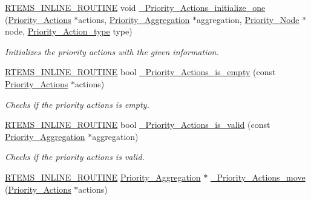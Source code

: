 \begin{DoxyCompactItemize}
\mbox{\hyperlink{group__RTEMSScoreBaseDefs_gac216239df231d5dbd15e3520b0b9313f}{R\+T\+E\+M\+S\+\_\+\+I\+N\+L\+I\+N\+E\+\_\+\+R\+O\+U\+T\+I\+NE}} void \mbox{\hyperlink{group__RTEMSScorePriority_gad2be4119adbe29c7da28463477622c8c}{\+\_\+\+Priority\+\_\+\+Actions\+\_\+initialize\+\_\+one}} (\mbox{\hyperlink{structPriority__Actions}{Priority\+\_\+\+Actions}} $\ast$actions, \mbox{\hyperlink{structPriority__Aggregation}{Priority\+\_\+\+Aggregation}} $\ast$aggregation, \mbox{\hyperlink{structPriority__Node}{Priority\+\_\+\+Node}} $\ast$node, \mbox{\hyperlink{group__RTEMSScorePriority_gae6fceeae8a1c66316277dc3b52e3ba27}{Priority\+\_\+\+Action\+\_\+type}} type)
\begin{DoxyCompactList}\small\item\em Initializes the priority actions with the given information. \end{DoxyCompactList}\item 
\mbox{\hyperlink{group__RTEMSScoreBaseDefs_gac216239df231d5dbd15e3520b0b9313f}{R\+T\+E\+M\+S\+\_\+\+I\+N\+L\+I\+N\+E\+\_\+\+R\+O\+U\+T\+I\+NE}} bool \mbox{\hyperlink{group__RTEMSScorePriority_ga11ca5379e29efb02baa8366570cfa87b}{\+\_\+\+Priority\+\_\+\+Actions\+\_\+is\+\_\+empty}} (const \mbox{\hyperlink{structPriority__Actions}{Priority\+\_\+\+Actions}} $\ast$actions)
\begin{DoxyCompactList}\small\item\em Checks if the priority actions is empty. \end{DoxyCompactList}\item 
\mbox{\hyperlink{group__RTEMSScoreBaseDefs_gac216239df231d5dbd15e3520b0b9313f}{R\+T\+E\+M\+S\+\_\+\+I\+N\+L\+I\+N\+E\+\_\+\+R\+O\+U\+T\+I\+NE}} bool \mbox{\hyperlink{group__RTEMSScorePriority_gabfe1f29214b3da4b3f09d607c8ebb7d3}{\+\_\+\+Priority\+\_\+\+Actions\+\_\+is\+\_\+valid}} (const \mbox{\hyperlink{structPriority__Aggregation}{Priority\+\_\+\+Aggregation}} $\ast$aggregation)
\begin{DoxyCompactList}\small\item\em Checks if the priority actions is valid. \end{DoxyCompactList}\item 
\mbox{\hyperlink{group__RTEMSScoreBaseDefs_gac216239df231d5dbd15e3520b0b9313f}{R\+T\+E\+M\+S\+\_\+\+I\+N\+L\+I\+N\+E\+\_\+\+R\+O\+U\+T\+I\+NE}} \mbox{\hyperlink{structPriority__Aggregation}{Priority\+\_\+\+Aggregation}} $\ast$ \mbox{\hyperlink{group__RTEMSScorePriority_ga96d8f44d7473f32a8740950d41f2fa7c}{\+\_\+\+Priority\+\_\+\+Actions\+\_\+move}} (\mbox{\hyperlink{structPriority__Actions}{Priority\+\_\+\+Actions}} $\ast$actions)

\end{DoxyCompactItemize}
